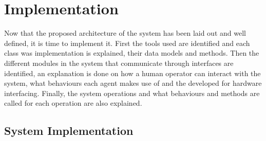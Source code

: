 


\glsresetall










\chapter{Implementation}
\label{cha:implementation}

Now that the proposed architecture of the system has been laid out and well defined, it is time to implement it. First the tools used are identified and each class was implementation is explained, their data models and methods. Then the different modules in the system that communicate through interfaces are identified, an explanation is done on how a human operator can interact with the system, what behaviours each agent makes use of and the developed  for hardware interfacing. Finally, the system operations and what behaviours and methods are called for each operation are also explained.\\

\section{System Implementation}
\label{sec:class_implementation}


